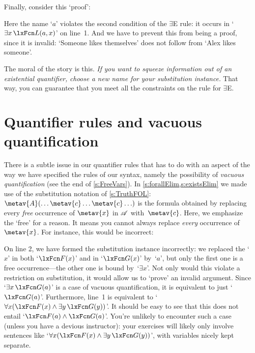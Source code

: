 Finally, consider this `proof':
\begin{fitchproof}
	\PR
	\open
		\AS
	\close
\ifHTMLtarget
\else
\fi
\end{fitchproof}
Here the name `$a$' violates the second condition of the $\exists$E
rule: it occurs in `$\exists x\, \atom{L}{a, x}$' on line~1. And we
have to prevent this from being a proof, since it is invalid: `Someone
likes themselves' does not follow from `Alex likes someone'.

The moral of the story is this. \emph{If you want to squeeze information out of an existential quantifier, choose a new name for your substitution instance.} That way, you can guarantee that you meet all the constraints on the rule for $\exists$E.

\section{Quantifier rules and vacuous quantification}

There is a subtle issue in our quantifier rules that has to do with an
aspect of the way we have specified the rules of our syntax, namely
the possibility of \emph{vacuous quantification} (see the end of
\cref{s:FreeVars}). In \cref{s:forallElim,s:existsElim} we made use of
the substitution notation of \cref{s:TruthFOL}: $\metav{A}(\ldots
\metav{c} \ldots \metav{c} \ldots)$ is the formula obtained by
replacing every \emph{free} occurrence of $\metav{x}$ in $\mathscr{A}$
with~$\metav{c}$. Here, we emphasize the `free' for a reason. It means
you cannot always replace \emph{every} occurrence of~$\metav{x}$. For
instance, this would be incorrect:
\begin{fitchproof}
	\PR
	\ifHTMLtarget
\else
\fi
\end{fitchproof}
On line 2, we have formed the substitution instance incorrectly: we
replaced the `$x$' in both `$\atom{F}{x}$' and in `$\atom{G}{x}$'
by~`$a$', but only the first one is a free occurrence---the other one
is bound by~`$\exists x$'. Not only would this violate a restriction
on substitution, it would allow us to `prove' an invalid argument.
Since `$\exists x\,\atom{G}{a}$' is a case of vacuous quantification,
it is equivalent to just `$\atom{G}{a}$'. Furthermore, line~1 is
equivalent to `$\forall x(\atom{F}{x} \land \exists y\,\atom{G}{y})$'.
It should be easy to see that this does not entail `$\atom{F}{a} \land
\atom{G}{a}$'. You're unlikely to encounter such a case (unless you
have a devious instructor): your exercises will likely only involve
sentences like `$\forall x(\atom{F}{x} \land \exists
y\,\atom{G}{y})$', with variables nicely kept separate.


